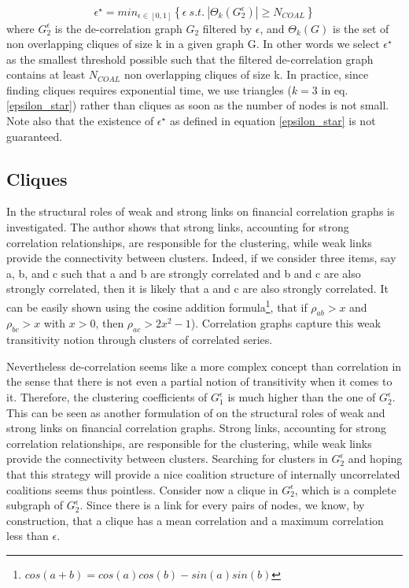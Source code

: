 \documentclass[journal]{IEEEtran}
\begin{document}
\begin{equation}
\label{epsilon_star}
\epsilon^{\star} = min_{ \epsilon \in [0,1]} \left\{ \epsilon\ s.t.\ |\Theta_{k}(G_{2}^{\epsilon})| \geq N_{COAL} \right\}
\end{equation} 
where $ G_{2}^{\epsilon} $ is the de-correlation graph $ G_{2} $ filtered by $ \epsilon $, and $ \Theta_{k}(G) $ is the set of non overlapping cliques of size k in a given graph G. In other words we select $ \epsilon^{\star} $ as the smallest threshold possible such that the filtered de-correlation graph contains at least $ N_{COAL} $ non overlapping cliques of size k. In practice, since finding cliques requires exponential time, we use triangles \cite{Schank2001} ($k=3$ in eq. \ref{epsilon_star}) rather than cliques as soon as the number of nodes is not small. Note also that the existence of $ \epsilon^{\star} $  as defined in equation  \ref{epsilon_star} is not guaranteed.

\subsection{Cliques}

In \cite{Garas2008} the structural roles of weak and strong links on financial correlation graphs is investigated. The author shows that strong links, accounting for strong correlation relationships, are responsible for the clustering, while weak links provide the connectivity between clusters. Indeed, if we consider three items, say a, b, and c such that a and b are strongly correlated and b and c are also strongly correlated, then it is likely that a and c are also strongly correlated. It can be easily shown using the cosine addition formula\footnote{ $ cos(a+b) = cos(a)cos(b) - sin(a)sin(b) $ }, that if $\rho_{ab} > x $ and $\rho_{bc} > x $ with $ x>0 $, then $\rho_{ac} > 2x^{2}-1$). Correlation graphs capture this weak transitivity notion through clusters of correlated series.

Nevertheless de-correlation seems like a more complex concept than correlation in the sense that there is not even a partial notion of transitivity when it comes to it. Therefore, the clustering coefficients of $ G_{1}^{\epsilon} $ is much higher than the one of $ G_{2}^{\epsilon} $. This can be seen as another formulation of \cite{Garas2008} on the structural roles of weak and strong links on financial correlation graphs. Strong links, accounting for strong correlation relationships, are responsible for the clustering, while weak links provide the connectivity between clusters. Searching for clusters in $ G_{2}^{\epsilon} $ and hoping that this strategy will provide a nice coalition structure of internally uncorrelated coalitions seems thus pointless. Consider now a clique in  $ G_{2}^{\epsilon} $, which is a complete subgraph of $ G_{2}^{\epsilon} $. Since there is a link for every pairs of nodes, we know, by construction, that a clique has a mean correlation and a maximum correlation less than $ \epsilon $. 
\end{document}
